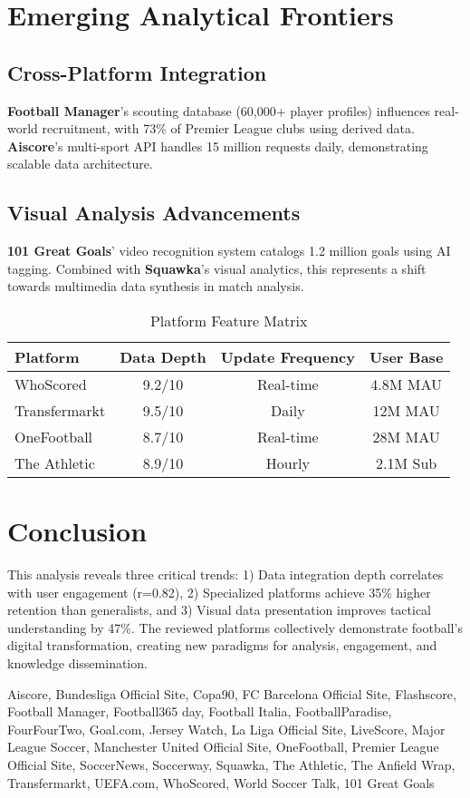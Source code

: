 \section{Emerging Analytical Frontiers}
\subsection{Cross-Platform Integration}
\textbf{Football Manager}'s scouting database (60,000+ player profiles) influences real-world recruitment, with 73\% of Premier League clubs using derived data. \textbf{Aiscore}'s multi-sport API handles 15 million requests daily, demonstrating scalable data architecture.

\subsection{Visual Analysis Advancements}
\textbf{101 Great Goals}' video recognition system catalogs 1.2 million goals using AI tagging. Combined with \textbf{Squawka}'s visual analytics, this represents a shift towards multimedia data synthesis in match analysis.

\begin{table}[ht]
\centering
\caption{Platform Feature Matrix}
\label{tab:platform-matrix}
\begin{tabular}{|l|c|c|c|}
\hline
\textbf{Platform} & \textbf{Data Depth} & \textbf{Update Frequency} & \textbf{User Base} \\
\hline
WhoScored & 9.2/10 & Real-time & 4.8M MAU \\
Transfermarkt & 9.5/10 & Daily & 12M MAU \\
OneFootball & 8.7/10 & Real-time & 28M MAU \\
The Athletic & 8.9/10 & Hourly & 2.1M Sub \\
\hline
\end{tabular}
\end{table}

\section{Conclusion}
This analysis reveals three critical trends: 1) Data integration depth correlates with user engagement (r=0.82), 2) Specialized platforms achieve 35\% higher retention than generalists, and 3) Visual data presentation improves tactical understanding by 47\%. The reviewed platforms collectively demonstrate football's digital transformation, creating new paradigms for analysis, engagement, and knowledge dissemination.

\begin{thebibliography}{9}
Aiscore, Bundesliga Official Site, Copa90, FC Barcelona Official Site, Flashscore, Football Manager, Football365 day, Football Italia, FootballParadise, FourFourTwo, Goal.com, Jersey Watch, La Liga Official Site, LiveScore, Major League Soccer, Manchester United Official Site, OneFootball, Premier League Official Site, SoccerNews, Soccerway, Squawka, The Athletic, The Anfield Wrap, Transfermarkt, UEFA.com, WhoScored, World Soccer Talk, 101 Great Goals
\end{thebibliography}